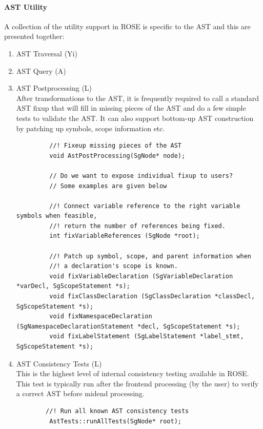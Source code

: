 \paragraph{AST Utility}
   A collection of the utility support in ROSE is specific to the AST and this are 
presented together:
\begin{enumerate}
   \item AST Traversal (Yi)
   \item AST Query (A)
   \item AST Postprocessing (L) \\
         After transformations to the AST, it is frequently required to call a
         standard AST fixup that will fill in missing pieces of the AST and do a few simple
         tests to validate the AST.
         It can also support bottom-up AST construction by patching up symbols, scope information etc.
    
         \begin{lstlisting}
         //! Fixeup missing pieces of the AST
         void AstPostProcessing(SgNode* node);
         
         // Do we want to expose individual fixup to users? 
         // Some examples are given below 

         //! Connect variable reference to the right variable symbols when feasible, 
         //! return the number of references being fixed. 
         int fixVariableReferences (SgNode *root);

         //! Patch up symbol, scope, and parent information when 
         //! a declaration's scope is known. 
         void fixVariableDeclaration (SgVariableDeclaration *varDecl, SgScopeStatement *s);
         void fixClassDeclaration (SgClassDeclaration *classDecl, SgScopeStatement *s);
         void fixNamespaceDeclaration (SgNamespaceDeclarationStatement *decl, SgScopeStatement *s);
         void fixLabelStatement (SgLabelStatement *label_stmt, SgScopeStatement *s);

         \end{lstlisting}

   \item AST Consistency Tests (L) \\
         This is the highest level of internal consistency testing available in ROSE.
         This test is typically run after the frontend processing (by the user) to
         verify a correct AST before midend processing.
         \begin{lstlisting}
        //! Run all known AST consistency tests
         AstTests::runAllTests(SgNode* root); 
        

\end{lstlisting}
\end{enumerate}
